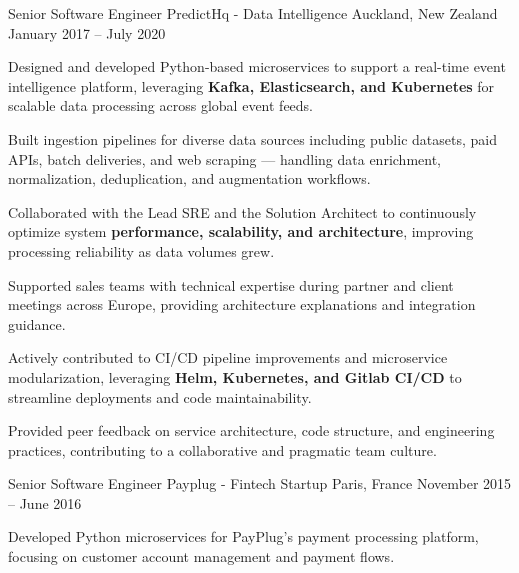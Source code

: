 \begin{cventries}
  \cventry
    {Senior Software Engineer} %
    {PredictHq - Data Intelligence} %
    {Auckland, New Zealand} %
    {January 2017 – July 2020} %
    {
      \begin{cvitems} %
        \item {Designed and developed Python-based microservices to support a real-time event intelligence platform, leveraging \textbf{Kafka, Elasticsearch, and Kubernetes} for scalable data processing across global event feeds.}
        \item {Built ingestion pipelines for diverse data sources including public datasets, paid APIs, batch deliveries, and web scraping — handling data enrichment, normalization, deduplication, and augmentation workflows.}
        \item {Collaborated with the Lead SRE and the Solution Architect to continuously optimize system \textbf{performance, scalability, and architecture}, improving processing reliability as data volumes grew.}
        \item {Supported sales teams with technical expertise during partner and client meetings across Europe, providing architecture explanations and integration guidance.}
        \item {Actively contributed to CI/CD pipeline improvements and microservice modularization, leveraging \textbf{Helm, Kubernetes, and Gitlab CI/CD} to streamline deployments and code maintainability.}
        \item {Provided peer feedback on service architecture, code structure, and engineering practices, contributing to a collaborative and pragmatic team culture.}
      \end{cvitems}
    }

  \cventry
    {Senior Software Engineer} %
    {Payplug - Fintech Startup} %
    {Paris, France} %
    {November 2015 – June 2016} %
    {
      \begin{cvitems} %
        \item {Developed Python microservices for PayPlug's payment processing platform, focusing on customer account management and payment flows.}
      \end{cvitems}
    }


\end{cventries}

